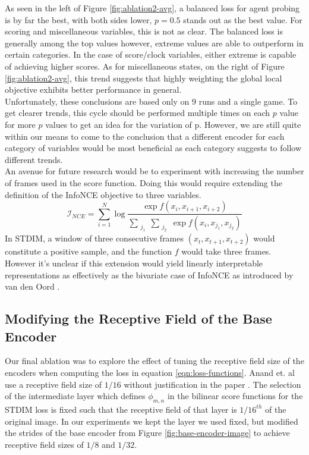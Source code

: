 As seen in the left of Figure \ref{fig:ablation2-avg}, a balanced loss for agent probing is by far the best, with both sides lower, $p=0.5$ stands out as the best value. For scoring and miscellaneous variables, this is not as clear. The balanced loss is generally among the top values however, extreme values are able to outperform in certain categories. In the case of score/clock variables, either extreme is capable of achieving higher scores. As for miscellaneous states, on the right of Figure \ref{fig:ablation2-avg}, this trend suggests that highly weighting the global local objective exhibits better performance in general. \\

Unfortunately, these conclusions are based only on 9 runs and a single game. To get clearer trends, this cycle should be performed multiple times on each $p$ value for more $p$ values to get an idea for the variation of p. However, we are still quite within our means to come to the conclusion that a different encoder for each category of variables would be most beneficial as each category suggests to follow different trends. \\

An avenue for future research would be to experiment with increasing the number of frames used in the score function. Doing this would require extending the definition of the InfoNCE objective to three variables.
\begin{equation}
\mathcal{I}_{NCE}=\sum_{i=1}^N\log{\frac{\exp{f(x_i,x_{i+1},x_{i+2})}}{\sum\limits_{\substack{j_1}}\sum\limits_{\substack{j_2}} \exp{f(x_i,x_{j_{1}},x_{j_{2}})}}}
\end{equation}
In STDIM, a window of three consecutive frames $(x_t, x_{t+1},x_{t+2})$ would constitute a positive sample, and  the function $f$ would take three frames. However it's unclear if this extension would yield linearly interpretable representations as effectively as the bivariate case of InfoNCE as introduced by van den Oord \cite{infoNCE}.

\subsection{Modifying the Receptive Field of the Base Encoder}
\label{section:receptive-field}

Our final ablation was to explore the effect of tuning the receptive field size of the encoders when computing the loss in equation \ref{eqn:loss-functions}. Anand et. al use a receptive field size of $1/16$ without justification in the paper \cite{main_article}. The selection of the intermediate layer which defines $\phi_{m,n}$ in the bilinear score functions for the STDIM loss is fixed such that the receptive field of that layer is $1/16^{th}$ of the original image. In our experiments we kept the layer we used fixed, but modified the strides of the base encoder from Figure \ref{fig:base-encoder-image} to achieve receptive field sizes of $1/8$ and $1/32$.

